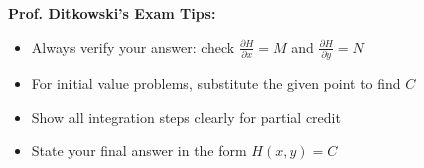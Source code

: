\documentclass[12pt]{article}
\begin{document}
\begin{examtip}
\textbf{Prof. Ditkowski's Exam Tips:}
\begin{itemize}
    \item Always verify your answer: check $\frac{\partial H}{\partial x} = M$ and $\frac{\partial H}{\partial y} = N$
    \item For initial value problems, substitute the given point to find $C$
    \item Show all integration steps clearly for partial credit
    \item State your final answer in the form $H(x,y) = C$
\end{itemize}
\end{examtip}
\end{document}
